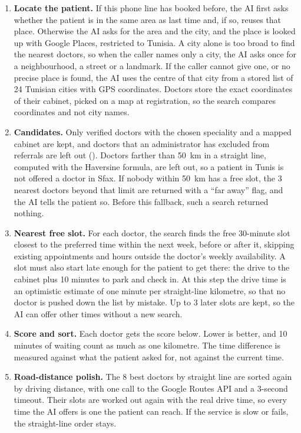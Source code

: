 \begin{enumerate}
    \item \textbf{Locate the patient.} If this phone line has booked before, the AI first asks whether the patient is in the same area as last time and, if so, reuses that place. Otherwise the AI asks for the area and the city, and the place is looked up with Google Places, restricted to Tunisia. A city alone is too broad to find the nearest doctors, so when the caller names only a city, the AI asks once for a neighbourhood, a street or a landmark. If the caller cannot give one, or no precise place is found, the AI uses the centre of that city from a stored list of 24 Tunisian cities with GPS coordinates. Doctors store the exact coordinates of their cabinet, picked on a map at registration, so the search compares coordinates and not city names.
    \item \textbf{Candidates.} Only verified doctors with the chosen speciality and a mapped cabinet are kept, and doctors that an administrator has excluded from referrals are left out (). Doctors farther than 50~km in a straight line, computed with the Haversine formula, are left out, so a patient in Tunis is not offered a doctor in Sfax. If nobody within 50~km has a free slot, the 3 nearest doctors beyond that limit are returned with a ``far away'' flag, and the AI tells the patient so. Before this fallback, such a search returned nothing.
    \item \textbf{Nearest free slot.} For each doctor, the search finds the free 30-minute slot closest to the preferred time within the next week, before or after it, skipping existing appointments and hours outside the doctor's weekly availability. A slot must also start late enough for the patient to get there: the drive to the cabinet plus 10 minutes to park and check in. At this step the drive time is an optimistic estimate of one minute per straight-line kilometre, so that no doctor is pushed down the list by mistake. Up to 3 later slots are kept, so the AI can offer other times without a new search.
    \item \textbf{Score and sort.} Each doctor gets the score below. Lower is better, and 10 minutes of waiting count as much as one kilometre. The time difference is measured against what the patient asked for, not against the current time.
    \item \textbf{Road-distance polish.} The 8 best doctors by straight line are sorted again by driving distance, with one call to the Google Routes API and a 3-second timeout. Their slots are worked out again with the real drive time, so every time the AI offers is one the patient can reach. If the service is slow or fails, the straight-line order stays.

\end{enumerate}
